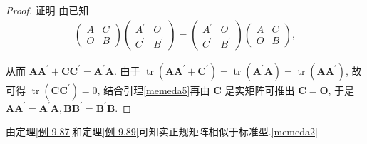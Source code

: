 \begin{proof}
    证明 由已知
    \begin{align*}
        \left(\begin{array}{ll}
                  A & C \\
                  O & B
              \end{array}\right)\left(\begin{array}{ll}
                                          A^{\prime} & O          \\
                                          C^{\prime} & B^{\prime}
                                      \end{array}\right)=\left(\begin{array}{ll}
                                                                   A^{\prime} & O          \\
                                                                   C^{\prime} & B^{\prime}
                                                               \end{array}\right)\left(\begin{array}{ll}
                                                                                           A & C \\
                                                                                           O & B
                                                                                       \end{array}\right),
    \end{align*}

    从而 $\boldsymbol{A} \boldsymbol{A}^{\prime}+\boldsymbol{C C}^{\prime}=\boldsymbol{A}^{\prime} \boldsymbol{A}$. 由于 $\operatorname{tr}\left(\boldsymbol{A A}^{\prime}+\boldsymbol{C}^{\prime}\right)=\operatorname{tr}\left(\boldsymbol{A}^{\prime} \boldsymbol{A}\right)=\operatorname{tr}\left(\boldsymbol{A} \boldsymbol{A}^{\prime}\right)$, 故可得 $\operatorname{tr}\left(\boldsymbol{C} \boldsymbol{C}^{\prime}\right)=0$, 结合引理\cref{memeda5}再由 $\boldsymbol{C}$ 是实矩阵可推出 $\boldsymbol{C}=\boldsymbol{O}$, 于是 $\boldsymbol{A} \boldsymbol{A}^{\prime}=\boldsymbol{A}^{\prime} \boldsymbol{A}, \boldsymbol{B B}^{\prime}=\boldsymbol{B}^{\prime} \boldsymbol{B}$.
\end{proof}

\begin{corollary}
    由定理\cref{例 9.87}和定理\cref{例 9.89}可知实正规矩阵相似于标准型.\cref{memeda2}
\end{corollary}

